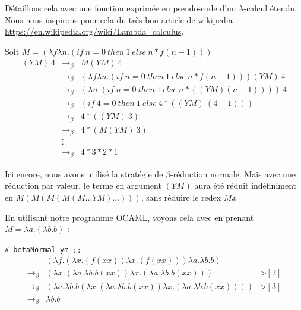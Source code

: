 \documentclass[11pt]{book}
\begin{document}
Détaillons cela avec une fonction exprimée en pseudo-code d'un $\lambda$-calcul étendu.
Nous nous inspirons pour cela du très bon article de wikipedia \url{https://en.wikipedia.org/wiki/Lambda_calculus}.


Soit $M = (\lambda f \lambda n .(if\ n=0\ then\ 1\ else\ n*f(n-1)))$
$$
\begin{array}{lll}
(YM)\ 4 & \rightarrow _\beta & M (YM)\ 4 \\
& \rightarrow _\beta & (\lambda f \lambda n .(if\ n=0\ then\ 1\ else\ n*f(n-1))) (YM)\ 4 \\
& \rightarrow _\beta & (\lambda  n . (if\ n=0\ then\ 1\ else\ n*((YM) (n-1))))\ 4 \\
& \rightarrow _\beta & (if\ 4=0\ then\ 1\ else\ 4*((YM)\ (4-1))) \\
& \rightarrow _\beta & 4 * ((YM)\ 3) \\
& \rightarrow _\beta & 4 * (M(YM)\ 3) \\
& \vdots & \\
& \rightarrow _\beta & 4 * 3 * 2 * 1 
\end{array}
$$

Ici encore, nous avons utilisé la stratégie de $\beta$-réduction normale. 
Mais avec une réduction par valeur, le terme en argument $(YM)$ aura été réduit indéfiniment en $M(M(M(M(M\ldots YM)\ldots)))$,
sans réduire le redex $Mx$


En utilisant notre programme OCAML, voyons cela avec en prenant $M = \lambda a. (\lambda b . b) $ :

\verb+# betaNormal ym ;;+
$$
\begin{array}{lll}
 & (\lambda f . (\lambda x . (f(xx))\lambda x . (f(xx)))\lambda a . \lambda b . b) &  \\
 \rightarrow _\beta & (\lambda x . (\lambda a . \lambda b . b(xx))\lambda x . (\lambda a . \lambda b . b(xx))) &\triangleright [2]  \\
 \rightarrow _\beta & (\lambda a . \lambda b . b(\lambda x . (\lambda a . \lambda b . b(xx))\lambda x . (\lambda a . \lambda b . b(xx))))  &\triangleright [3]  \\
 \rightarrow _\beta & \lambda b . b &  \\
\end{array}
$$
\end{document}
